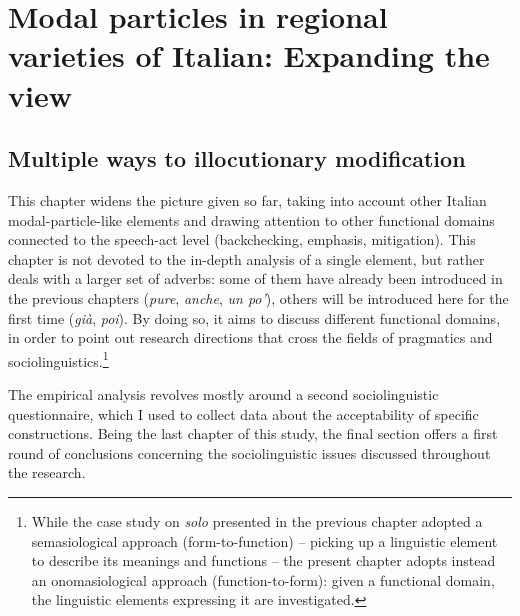 \chapter{Modal particles in regional varieties of Italian: Expanding the view}\label{sec:9}
\hypertarget{Toc124860680}{}\section{Multiple ways to illocutionary modification}
\hypertarget{Toc124860681}{}
This chapter widens the picture given so far, taking into account other Italian modal-particle-like elements and drawing attention to other functional domains connected to the speech-act level (backchecking, emphasis, mitigation). This chapter is not devoted to the in-depth analysis of a single element, but rather deals with a larger set of adverbs: some of them have already been introduced in the previous chapters (\textit{pure}, \textit{anche}, \textit{un po’}), others will be introduced here for the first time (\textit{già}, \textit{poi}). By doing so, it aims to discuss different functional domains, in order to point out research directions that cross the fields of pragmatics and sociolinguistics.\footnote{While the case study on \textit{solo} presented in the previous chapter adopted a semasiological approach (form-to-function) – picking up a linguistic element to describe its meanings and functions – the present chapter adopts instead an onomasiological approach (function-to-form): given a functional domain, the linguistic elements expressing it are investigated.}

The empirical analysis revolves mostly around a second sociolinguistic questionnaire, which I used to collect data about the acceptability of specific constructions. Being the last chapter of this study, the final section offers a first round of conclusions concerning the sociolinguistic issues discussed throughout the research.

